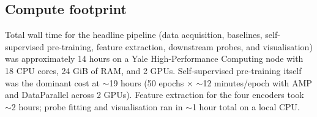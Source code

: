 \documentclass{article}
\begin{document}


\subsection{Compute footprint}
Total wall time for the headline pipeline (data acquisition, baselines,
self-supervised pre-training, feature extraction, downstream probes, and
visualisation) was approximately 14 hours on a Yale High-Performance Computing
node with 18 CPU cores, 24 GiB of RAM, and 2 GPUs. Self-supervised
pre-training itself was the dominant cost at $\sim$19 hours
(50 epochs $\times$ $\sim$12 minutes/epoch with AMP and DataParallel across
2 GPUs). Feature extraction for the four encoders took $\sim$2 hours; probe
fitting and visualisation ran in $\sim$1 hour total on a local CPU.
\end{document}
